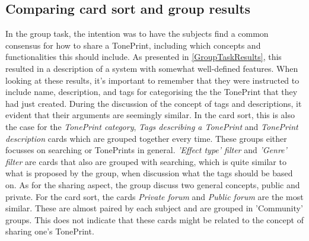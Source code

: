 \subsection*{Comparing card sort and group results}
\label{ComparingGroupAndCard}
In the group task, the intention was to have the subjects find a common consensus for how to share a TonePrint, including which concepts and functionalities this should include. As presented in \autoref{GroupTaskResults}, this resulted in a description of a system with somewhat well-defined features. When looking at these results, it's important to remember that they were instructed to include name, description, and tags for categorising the the TonePrint that they had just created. During the discussion of the concept of tags and descriptions, it evident that their arguments are seemingly similar. In the card sort, this is also the case for the \textit{TonePrint category}, \textit{Tags describing a TonePrint} and \textit{TonePrint description} cards which are grouped together every time. These groups either focusses on searching or TonePrints in general. \textit{'Effect type' filter} and \textit{'Genre' filter} are cards that also are grouped with searching, which is quite similar to what is proposed by the group, when discussion what the tags should be based on.  As for the sharing aspect, the group discuss two general concepts, public and private. For the card sort, the cards \textit{Private forum} and \textit{Public forum} are the most similar. These are almost paired by each subject and are grouped in 'Community' groups. This does not indicate that these cards might be related to the concept of sharing one's TonePrint. 
\newpage

